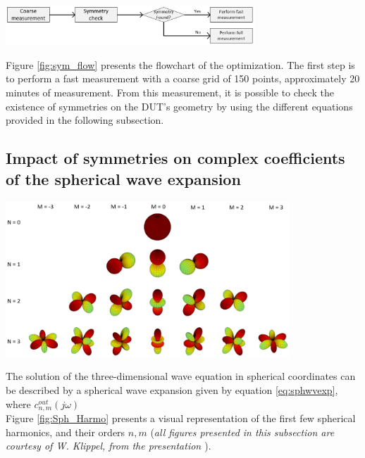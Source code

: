 \documentclass{report}
\begin{document}
\begin{center}
	\includegraphics[width=0.7\textwidth]{Sym/flowchart} 
    \captionsetup{hypcap=false} 
	\label{fig:sym_flow}
\end{center}

Figure \ref{fig:sym_flow} presents the flowchart of the optimization. The first step is to perform a fast measurement with a coarse grid of 150 points, approximately 20 minutes of measurement. From this measurement, it is possible to check the existence of symmetries on the DUT's geometry by using the different equations provided in the following subsection. 

\subsection{Impact of symmetries on complex coefficients of the spherical wave expansion}
\label{chap:sym}

\begin{minipage}{0.5\textwidth}
\begin{center}
	\includegraphics[width=0.8\textwidth]{Appendix/Spherical_Harmo}
    \captionsetup{hypcap=false}
    \label{fig:Sph_Harmo}
\end{center}
\end{minipage}
\begin{minipage}{0.5\textwidth}
The solution of the three-dimensional wave equation in spherical coordinates can be described by a spherical wave expansion given by equation \ref{eq:sphwvexp}, where $c_{n,m}^{out}(j \omega)$ \\
Figure \ref{fig:Sph_Harmo} presents a visual representation of the first few spherical harmonics, and their orders $n,m$ (\textit{all figures presented in this subsection are courtesy of W. Klippel, from the presentation \cite{lect2018}}). 
\end{minipage}
\vspace{0.4cm}
\end{document}
